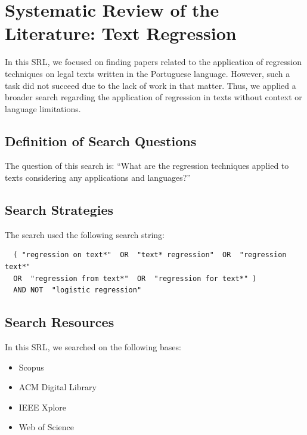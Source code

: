\chapter{Systematic Review of the Literature: Text Regression}\label{ap:rsl_regression_law}

In this SRL, we focused on finding papers related to the application of regression techniques on legal texts written in the Portuguese language. However, such a task did not succeed due to the lack of work in that matter. Thus, we applied a broader search regarding the application of regression in texts without context or language limitations.

\section{Definition of Search Questions}

The question of this search is: ``What are the regression techniques applied to texts considering any applications and languages?''

\section{Search Strategies}

The search used the following search string:

\begin{verbatim}
  ( "regression on text*"  OR  "text* regression"  OR  "regression text*"  
  OR  "regression from text*"  OR  "regression for text*" )  
  AND NOT  "logistic regression"  
\end{verbatim}



\section{Search Resources}
In this SRL, we searched on the following bases:

\begin{itemize}[noitemsep]
    \item Scopus
    \item ACM Digital Library
    \item IEEE Xplore
    \item Web of Science
\end{itemize}

